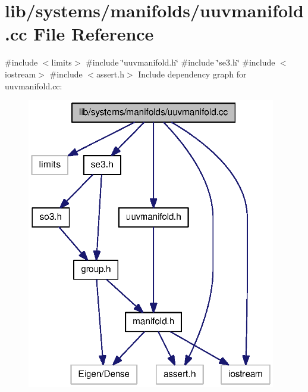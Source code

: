 \section{lib/systems/manifolds/uuvmanifold.cc \-File \-Reference}
\label{uuvmanifold_8cc}
{\ttfamily \#include $<$limits$>$}\*
{\ttfamily \#include \char`\"{}uuvmanifold.\-h\char`\"{}}\*
{\ttfamily \#include \char`\"{}se3.\-h\char`\"{}}\*
{\ttfamily \#include $<$iostream$>$}\*
{\ttfamily \#include $<$assert.\-h$>$}\*
\-Include dependency graph for uuvmanifold.\-cc\-:
\nopagebreak
\begin{figure}[H]
\begin{center}
\leavevmode
\includegraphics[width=308pt]{uuvmanifold_8cc__incl}
\end{center}
\end{figure}
